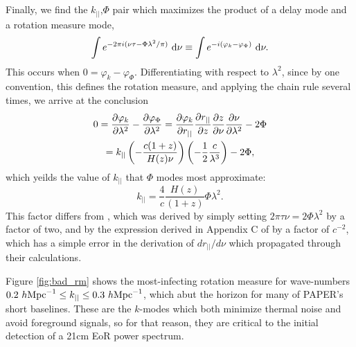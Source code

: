 Finally, we find the $k_{||}$,$\Phi$ pair which maximizes the product of a delay mode and a rotation
measure mode, 
\begin{equation}
  \int e^{-2\pi i(\nu\tau-\Phi\lambda^2/\pi)}\ \mathrm{d}\nu 
  \equiv \int e^{-i (\varphi_k - \varphi_\Phi)}\ \mathrm{d}\nu.
\end{equation}
This occurs when $0 = \varphi_k - \varphi_\Phi$. Differentiating with respect to
$\lambda^2$, since by one convention, this defines the rotation measure, and applying the chain rule
several times, we arrive at the conclusion
\begin{gather}
  0 = \frac{\partial \varphi_k}{\partial \lambda^2} - \frac{\partial \varphi_\Phi}{\partial \lambda^2}
 = \frac{\partial \varphi_k}{\partial r_{||}}\frac{\partial r_{||}}{\partial z}\frac{\partial z}{\partial \nu}\frac{\partial \nu}{\partial \lambda^2} - 2\Phi
 \nonumber \\ =
 k_{||}\left(-\frac{c(1+z)}{H(z)\nu}\right)\left(-\frac{1}{2}\frac{c}{\lambda^3}\right) - 2\Phi, 
\end{gather}
which yeilds the value of $k_{||}$ that $\Phi$ modes most approximate: 
\begin{equation}
 k_{||} = \frac{4}{c}\frac{H(z)}{(1+z)}\Phi\lambda^2. 
 \label{eq:bad_k}
\end{equation}
This factor differs from \citet{Moore2013}, which was derived by simply setting $2\pi\tau\nu =
2\Phi\lambda^2$ by a factor of two, and by the expression derived in Appendix C of \citet{Pen2009}
by a factor of $c^{-2}$, which has a simple error in the derivation of $dr_{||}/d\nu$ which propagated
through their calculations.

Figure \ref{fig:bad_rm} shows the most-infecting rotation measure for wave-numbers 
$0.2\ h{\rm Mpc}^{-1} \le k_{||} \le 0.3\ h{\rm Mpc}^{-1} $, which abut the horizon for many of
PAPER's short baselines. These are the $k$-modes which both minimize thermal noise and avoid
foreground signals, so for that reason, they are critical to the initial detection of a 21cm EoR
power spectrum.
